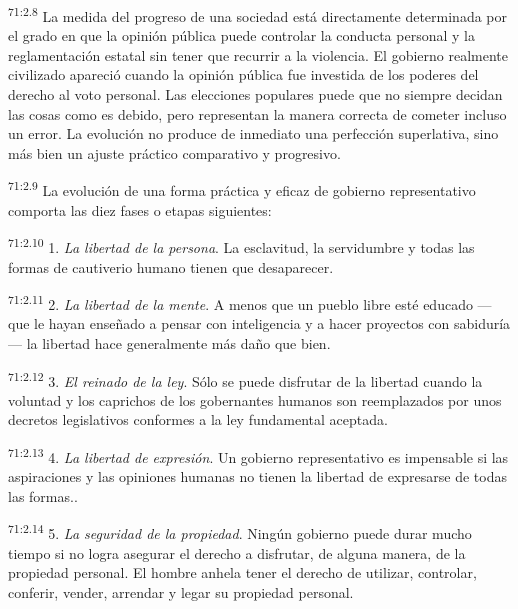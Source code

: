 \par
\textsuperscript{71:2.8} La medida del progreso de una sociedad está directamente determinada por el grado en que la opinión pública puede controlar la conducta personal y la reglamentación estatal sin tener que recurrir a la violencia. El gobierno realmente civilizado apareció cuando la opinión pública fue investida de los poderes del derecho al voto personal. Las elecciones populares puede que no siempre decidan las cosas como es debido, pero representan la manera correcta de cometer incluso un error. La evolución no produce de inmediato una perfección superlativa, sino más bien un ajuste práctico comparativo y progresivo.

\par
\textsuperscript{71:2.9} La evolución de una forma práctica y eficaz de gobierno representativo comporta las diez fases o etapas siguientes:

\par
\textsuperscript{71:2.10} 1. \textit{La libertad de la persona}. La esclavitud, la servidumbre y todas las formas de cautiverio humano tienen que desaparecer.

\par
\textsuperscript{71:2.11} 2. \textit{La libertad de la mente}. A menos que un pueblo libre esté educado ---que le hayan enseñado a pensar con inteligencia y a hacer proyectos con sabiduría--- la libertad hace generalmente más daño que bien.

\par
\textsuperscript{71:2.12} 3. \textit{El reinado de la ley}. Sólo se puede disfrutar de la libertad cuando la voluntad y los caprichos de los gobernantes humanos son reemplazados por unos decretos legislativos conformes a la ley fundamental aceptada.

\par
\textsuperscript{71:2.13} 4. \textit{La libertad de expresión}. Un gobierno representativo es impensable si las aspiraciones y las opiniones humanas no tienen la libertad de expresarse de todas las formas..

\par
\textsuperscript{71:2.14} 5. \textit{La seguridad de la propiedad}. Ningún gobierno puede durar mucho tiempo si no logra asegurar el derecho a disfrutar, de alguna manera, de la propiedad personal. El hombre anhela tener el derecho de utilizar, controlar, conferir, vender, arrendar y legar su propiedad personal.

